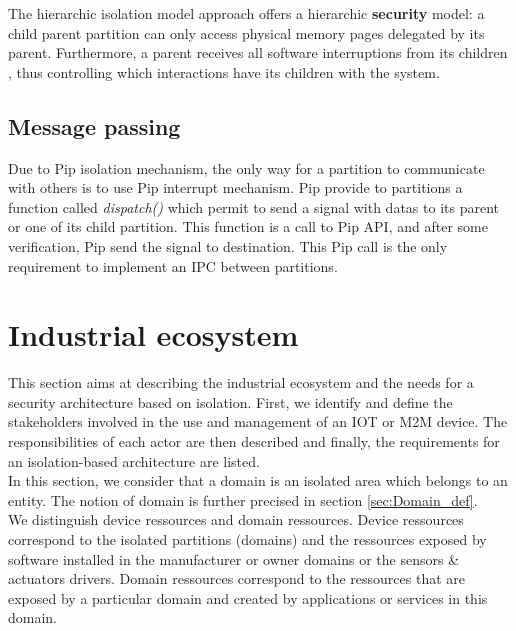 \documentclass[conference]{IEEEtran}
\begin{document}
The hierarchic isolation model approach offers a hierarchic \textbf{security} model: a child parent partition can only access physical memory pages delegated by its parent. Furthermore, a parent receives all software interruptions from its children%
, thus controlling which interactions have its children with the system.

\subsection{Message passing}
Due to Pip isolation mechanism, the only way for a partition to communicate with others is to use Pip interrupt mechanism. Pip provide to partitions a function called \textit{dispatch()} which permit to send a signal with datas to its parent or one of its child partition. This function is a call to Pip API, and after some verification, Pip send the signal to destination. This Pip call is the only requirement to implement an IPC between partitions.



\section{Industrial ecosystem}
\label{sec:Industrial_ecosystem}
This section aims at describing the industrial ecosystem and the needs for a security architecture based on isolation. First, we identify and define the stakeholders involved in the use and management of an IOT or M2M device. The responsibilities of each actor are then described and finally, the requirements for an isolation-based architecture are listed.\\

In this section, we consider that a domain is an isolated area which belongs to an entity. The notion of domain is further precised in section \ref{sec:Domain_def}.\\

We distinguish device ressources and domain ressources. Device ressources correspond to the isolated partitions (domains) and the ressources exposed by software installed in the manufacturer or owner domains or the sensors \& actuators drivers. Domain ressources correspond to the ressources that are exposed by a particular domain and created by applications or services in this domain.\\
\end{document}
